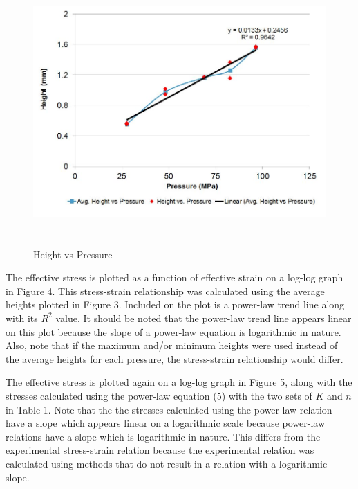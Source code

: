 \documentclass[12pt]{article}
\begin{document}
\begin{figure}[h] %
   \centering
   \includegraphics[width=5.5in,height=4in]{height_vs_pressure.jpg} 
   \caption{Height vs Pressure}
\end{figure}
\bigskip

\newpage

The effective stress is plotted as a function of effective strain on a log-log graph in Figure 4. This stress-strain relationship was calculated using the average heights plotted in Figure 3. Included on the plot is a power-law trend line along with its $R^2$ value. It should be noted that the power-law trend line appears linear on this plot because the slope of a power-law equation is logarithmic in nature. Also, note that if the maximum and/or minimum heights were used instead of the average heights for each pressure, the stress-strain relationship would differ.
\bigskip


The effective stress is plotted again on a log-log graph in Figure 5, along with the stresses calculated using the power-law equation (5) with the two sets of $K$ and $n$ in Table 1. Note that the the stresses calculated using the power-law relation have a slope which appears linear on a logarithmic scale because power-law relations have a slope which is logarithmic in nature. This differs from the experimental stress-strain relation because the experimental relation was calculated using methods that do not result in a relation with a logarithmic slope.
\bigskip
\bigskip
\end{document}

